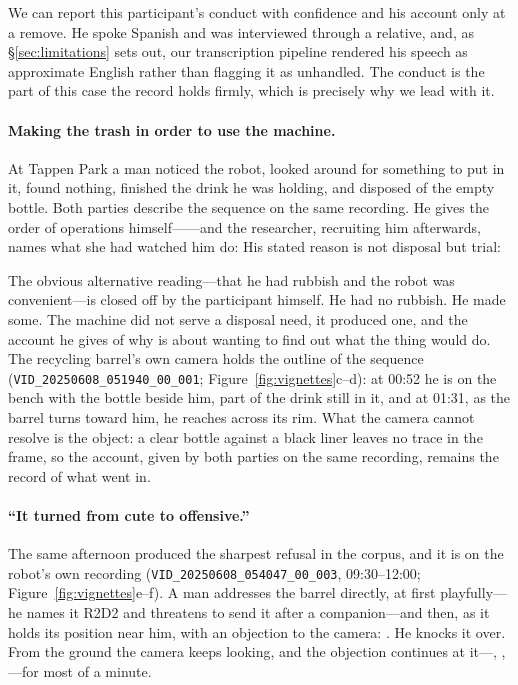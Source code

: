 We can report this participant's conduct with confidence and his account only at
a remove. He spoke Spanish and was interviewed through a relative, and, as
\S\ref{sec:limitations} sets out, our transcription pipeline rendered his speech
as approximate English rather than flagging it as unhandled. The conduct is the
part of this case the record holds firmly, which is precisely why we lead with
it.

\paragraph{Making the trash in order to use the machine.}
At Tappen Park a man noticed the robot, looked around for something to put in it,
found nothing, finished the drink he was holding, and disposed of the empty
bottle. Both parties describe the sequence on the same recording. He gives the
order of operations himself------and the
researcher, recruiting him afterwards, names what she had watched him do:
 His stated
reason is not disposal but trial: 

The obvious alternative reading---that he had rubbish and the robot was
convenient---is closed off by the participant himself. He had no rubbish. He made
some. The machine did not serve a disposal need, it produced one, and the account
he gives of why is about wanting to find out what the thing would do. The
recycling barrel's own camera holds the outline of the sequence
(\texttt{VID\_20250608\_051940\_00\_001}; Figure~\ref{fig:vignettes}c--d): at
00:52 he is on the bench with the bottle beside him, part of the drink still in
it, and at 01:31, as the barrel turns toward him, he reaches across its rim.
What the camera cannot resolve is the object: a clear bottle against a black
liner leaves no trace in the frame, so the account, given by both parties on
the same recording, remains the record of what went in.

\paragraph{``It turned from cute to offensive.''}
The same afternoon produced the sharpest refusal in the corpus, and it is on the
robot's own recording (\texttt{VID\_20250608\_054047\_00\_003}, 09:30--12:00;
Figure~\ref{fig:vignettes}e--f). A man addresses the barrel directly, at first
playfully---he names it R2D2 and threatens to send it after a companion---and
then, as it holds its position near him, with an objection to the camera:
.
He knocks it over. From the ground the camera keeps looking, and the objection
continues at it---, , ---for most of a minute.

